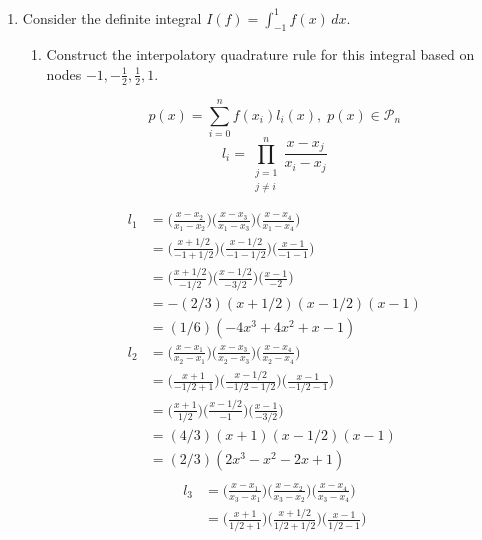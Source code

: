 \documentclass{article}
\begin{document}
\begin{enumerate}
\begin{enumerate}
        \end{enumerate}
    \newpage
    \item Consider the definite integral $I(f) = \int_{-1}^1 f(x) \,dx$.

        \begin{enumerate}
            \item Construct the interpolatory quadrature rule for this integral based on nodes $-1, -\frac{1}{2}, \frac{1}{2}, 1$.

            \[p(x) = \sum_{i=0}^n f(x_i)l_i(x),\; p(x) \in \mathcal{P}_n\]
            \[l_i = \prod_{\substack{j=1 \\ j\neq i}}^n\frac{x-x_j}{x_i-x_j} \]
            \begin{multicols}{2}
            \noindent
            \begin{align*}
                l_1 &= \Big( \frac{x - x_2}{x_1 - x_2}\Big)\Big( \frac{x - x_3}{x_1 - x_3}\Big)\Big( \frac{x - x_4}{x_1 - x_4}\Big)\\ 
                &= \Big( \frac{x + 1/2}{-1 + 1/2}\Big)\Big( \frac{x - 1/2}{-1 - 1/2}\Big)\Big( \frac{x - 1}{-1 - 1}\Big)\\ 
                &= \Big( \frac{x + 1/2}{-1/2}\Big)\Big( \frac{x - 1/2}{- 3/2}\Big)\Big( \frac{x - 1}{-2}\Big)\\ 
                &= -(2/3) ( x + 1/2)( x - 1/2)( x - 1)\\ 
                &= (1/6) (-4x^3+4x^2+x-1)\\ 
                l_2 &= \Big( \frac{x - x_1}{x_2 - x_1}\Big)\Big( \frac{x - x_3}{x_2 - x_3}\Big)\Big( \frac{x - x_4}{x_2 - x_4}\Big)\\ 
                &= \Big( \frac{x + 1}{-1/2 + 1}\Big)\Big( \frac{x - 1/2}{-1/2 - 1/2}\Big)\Big( \frac{x - 1}{-1/2 - 1}\Big)\\ 
                &= \Big( \frac{x + 1}{1/2}\Big)\Big( \frac{x - 1/2}{-1}\Big)\Big( \frac{x - 1}{-3/2}\Big)\\ 
                &= (4/3)( x + 1)(x - 1/2)(x - 1)\\ 
                &= (2/3)(2x^3-x^2-2x+1)\\ 
            \end{align*} 
            \begin{align*}
                l_3 &= \Big( \frac{x - x_1}{x_3 - x_1}\Big)\Big( \frac{x - x_2}{x_3 - x_2}\Big)\Big( \frac{x - x_4}{x_3 - x_4}\Big)\\ 
                &= \Big( \frac{x + 1}{1/2 + 1}\Big)\Big( \frac{x + 1/2}{1/2 + 1/2}\Big)\Big( \frac{x - 1}{1/2 - 1}\Big)\\ 

\end{align*}
\end{multicols}
\end{enumerate}
\end{enumerate}
\end{document}
